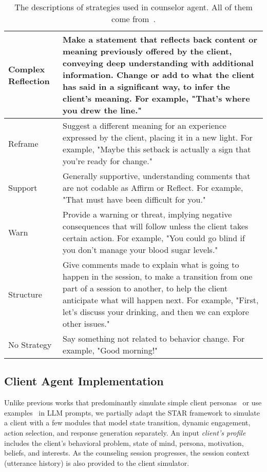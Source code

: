 \begin{table*}[tb]
\begin{tabularx}{\textwidth}{lX}
Complex Reflection & Make a statement that reflects back content or meaning previously offered by the client, conveying deep understanding with additional information. Change or add to what the client has said in a significant way, to infer the client's meaning. For example, "That’s where you drew the line." \\ \hline
Reframe & Suggest a different meaning for an experience expressed by the client, placing it in a new light. For example, "Maybe this setback is actually a sign that you're ready for change." \\ \hline
Support & Generally supportive, understanding comments that are not codable as Affirm or Reflect. For example, "That must have been difficult for you." \\ \hline
Warn & Provide a warning or threat, implying negative consequences that will follow unless the client takes certain action. For example, "You could go blind if you don’t manage your blood sugar levels." \\ \hline
Structure & Give comments made to explain what is going to happen in the session, to make a transition from one part of a session to another, to help the client anticipate what will happen next. For example, "First, let’s discuss your drinking, and then we can explore other issues." \\ \hline
No Strategy & Say something not related to behavior change. For example, "Good morning!"
\\ \bottomrule
\end{tabularx}
\caption{The descriptions of strategies used in counselor agent. All of them come from~\citet{miller2012motivational}.}
\label{tab:counselor strategy}
\end{table*}



\subsection{Client Agent Implementation}
\label{app:client simulation}
Unlike previous works that predominantly simulate simple client personas~\citep{yosef2024assessing,wu2023towards} or use examples~\citep{chiu2024computational} in LLM prompts, we partially adapt the STAR framework to simulate a client with a few modules that model state transition, dynamic engagement, action selection, and response generation separately. An input {\em client's profile} includes the client's behavioral problem, state of mind, persona, motivation, beliefs, and interests. As the counseling session progresses, the session context (utterance history) is also provided to the client simulator.

